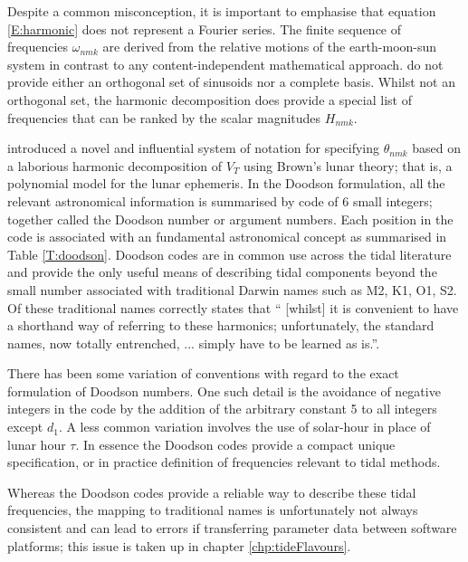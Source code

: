 Despite a common misconception, it is important to emphasise that equation \ref{E:harmonic} does not represent a Fourier series.  The finite sequence of frequencies $\omega_{nmk}$ are derived from the relative motions of the earth-moon-sun system in contrast to any content-independent mathematical approach. 
do not provide either an orthogonal set of sinusoids nor a complete basis.
Whilst not an orthogonal set, the harmonic decomposition does provide a special list of frequencies that can be ranked by the scalar magnitudes $H_{nmk}$. 




\citet{Doodson:1921kt} introduced a novel and influential system of notation for specifying $\theta_{nmk}$ based on a laborious harmonic decomposition of $V_T$ using Brown's lunar theory; that is, a polynomial model for the lunar ephemeris.  
In the Doodson formulation, all the relevant astronomical information is summarised by code of 6 small integers; together called the Doodson number or argument numbers.   Each position in the code is associated with an fundamental astronomical concept as summarised in Table \ref{T:doodson}.  Doodson codes are in common use across the tidal literature and provide the only useful means of describing tidal components beyond the small number associated with traditional Darwin names such as M2, K1, O1, S2.
Of these traditional names \citet{agnew2015} correctly states that `` [whilst] it is convenient to have a shorthand way of referring to these harmonics; unfortunately, the standard names,  now totally entrenched, ... simply have to be learned as is.''.

There has been some variation of conventions with regard to the exact formulation of Doodson numbers.  One such detail is the avoidance of negative integers in the code by the addition of the arbitrary constant 5 to all integers except $d_1$.   A less common variation involves the use of solar-hour in place of lunar hour $\tau$.  
In essence the Doodson codes provide a compact unique specification, or in practice definition of frequencies relevant to tidal methods.

Whereas the Doodson codes provide a reliable way to describe these tidal frequencies, the mapping to traditional names is unfortunately not always consistent and can lead to errors if transferring parameter data between software platforms; this issue is taken up in chapter \ref{chp:tideFlavours}.


